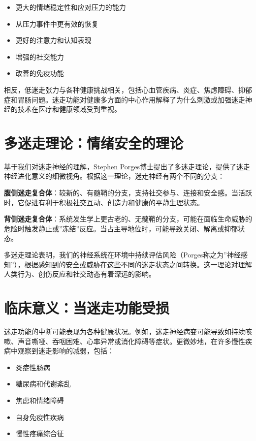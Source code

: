 \documentclass[
  Letterpaper,
]{scrbook}
\providecommand{\tightlist}{%
  \setlength{\itemsep}{0pt}\setlength{\parskip}{0pt}}\usepackage{longtable,booktabs,array}
\begin{document}
\begin{itemize}
\tightlist
\item
  更大的情绪稳定性和应对压力的能力
\item
  从压力事件中更有效的恢复
\item
  更好的注意力和认知表现
\item
  增强的社交能力
\item
  改善的免疫功能
\end{itemize}

相反，低迷走张力与各种健康挑战相关，包括心血管疾病、炎症、焦虑障碍、抑郁症和胃肠问题。迷走功能对健康多方面的中心作用解释了为什么刺激或加强迷走神经的技术在医疗和健康领域受到重视。

\section{多迷走理论：情绪安全的理论}\label{ux591aux8ff7ux8d70ux7406ux8bbaux60c5ux7eeaux5b89ux5168ux7684ux7406ux8bba}

基于我们对迷走神经的理解，Stephen
Porges博士提出了多迷走理论，提供了迷走神经进化意义的细微视角。根据这一理论，迷走神经有两个不同的分支：

\textbf{腹侧迷走复合体}：较新的、有髓鞘的分支，支持社交参与、连接和安全感。当活跃时，它促进有利于积极社交互动、创造力和健康的平静生理状态。

\textbf{背侧迷走复合体}：系统发生学上更古老的、无髓鞘的分支，可能在面临生命威胁的危险时触发静止或''冻结''反应。当占主导地位时，可能导致关闭、解离或抑郁状态。

多迷走理论表明，我们的神经系统在环境中持续评估风险（Porges称之为''神经感知''），根据感知到的安全或威胁在这些不同的迷走状态之间转换。这一理论对理解人类行为、创伤反应和社交动态有着深远的影响。

\section{临床意义：当迷走功能受损}\label{ux4e34ux5e8aux610fux4e49ux5f53ux8ff7ux8d70ux529fux80fdux53d7ux635f}

迷走功能的中断可能表现为各种健康状况。例如，迷走神经病变可能导致如持续咳嗽、声音嘶哑、吞咽困难、心率异常或消化障碍等症状。更微妙地，在许多慢性疾病中观察到迷走影响的减弱，包括：

\begin{itemize}
\tightlist
\item
  炎症性肠病
\item
  糖尿病和代谢紊乱
\item
  焦虑和情绪障碍
\item
  自身免疫性疾病
\item
  慢性疼痛综合征
\end{itemize}
\end{document}
